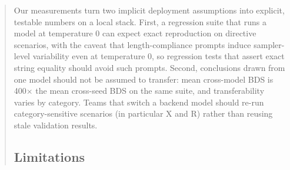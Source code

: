 \documentclass[11pt]{article}
\begin{document}
\begin{abstract}
Our measurements turn two implicit deployment assumptions into explicit,
testable numbers on a local stack. First, a regression suite that runs a
model at temperature 0 can expect exact reproduction on directive
scenarios, with the caveat that length-compliance prompts induce
sampler-level variability even at temperature 0, so regression tests that
assert exact string equality should avoid such prompts. Second, conclusions
drawn from one model should not be assumed to transfer: mean cross-model
BDS is 400$\times$ the mean cross-seed BDS on the same suite, and
transferability varies by category. Teams that switch a backend model
should re-run category-sensitive scenarios (in particular \textsc{X} and
\textsc{R}) rather than reusing stale validation results.

\subsection{Limitations}


\end{abstract}
\end{document}

